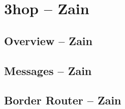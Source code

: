 \section{3hop -- Zain}

\subsection{Overview -- Zain}
\subsection{Messages -- Zain}
\subsection{Border Router -- Zain}
